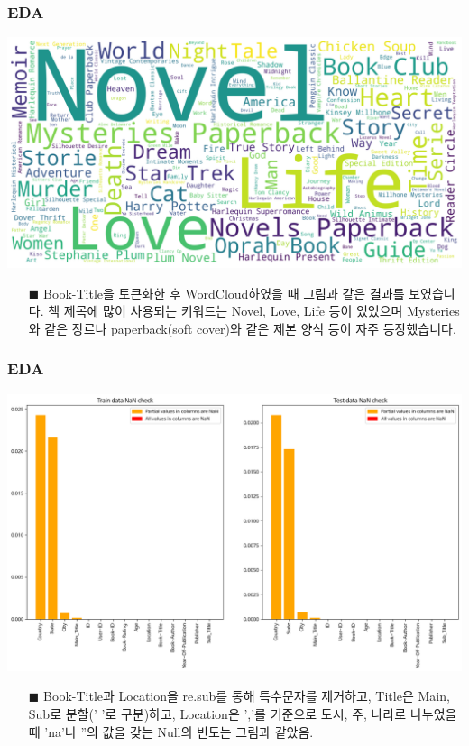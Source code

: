 \documentclass{beamer}
\begin{document}
\begin{frame}
\frametitle{EDA}

\centering
\includegraphics[scale=0.3]{book-title.png}

\begin{itemize}
\item[$\blacksquare$] {\footnotesize Book-Title을 토큰화한 후 WordCloud하였을 때 그림과 같은 결과를 보였습니다. 책 제목에 많이 사용되는 키워드는 Novel, Love, Life 등이 있었으며 Mysteries와 같은 장르나 paperback(soft cover)와 같은 제본 양식 등이 자주 등장했습니다.} 

\end{itemize}
\end{frame}

\begin{frame}
\frametitle{EDA}

\centering
\includegraphics[scale=0.28]{nan_data.png}

\begin{itemize}
\item[$\blacksquare$] {\footnotesize Book-Title과 Location을 re.sub를 통해 특수문자를 제거하고, Title은 Main, Sub로 분할('  '로 구분)하고, Location은 ','를 기준으로 도시, 주, 나라로 나누었을 때 'na'나 ''의 값을 갖는 Null의 빈도는 그림과 같았음.} 

\end{itemize}
\end{frame}
\end{document}
